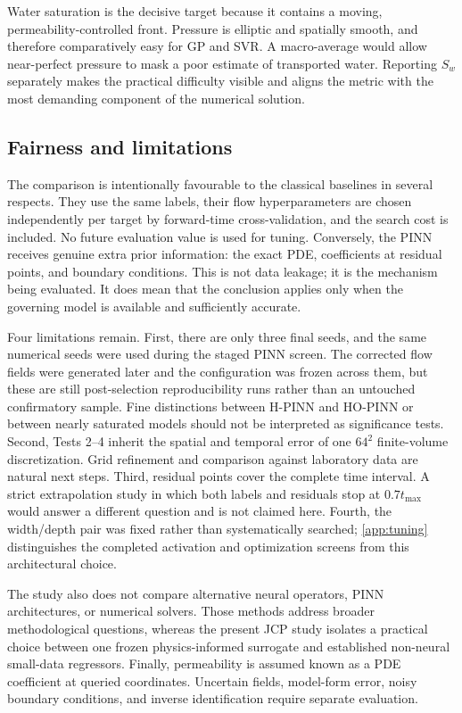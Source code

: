 Water saturation is the decisive target because it contains a moving, permeability-controlled front. Pressure is elliptic and spatially smooth, and therefore comparatively easy for GP and SVR. A macro-average would allow near-perfect pressure to mask a poor estimate of transported water. Reporting \(S_w\) separately makes the practical difficulty visible and aligns the metric with the most demanding component of the numerical solution.

\subsection{Fairness and limitations}

The comparison is intentionally favourable to the classical baselines in several respects. They use the same labels, their flow hyperparameters are chosen independently per target by forward-time cross-validation, and the search cost is included. No future evaluation value is used for tuning. Conversely, the PINN receives genuine extra prior information: the exact PDE, coefficients at residual points, and boundary conditions. This is not data leakage; it is the mechanism being evaluated. It does mean that the conclusion applies only when the governing model is available and sufficiently accurate.

Four limitations remain. First, there are only three final seeds, and the same numerical seeds were used during the staged PINN screen. The corrected flow fields were generated later and the configuration was frozen across them, but these are still post-selection reproducibility runs rather than an untouched confirmatory sample. Fine distinctions between H-PINN and HO-PINN or between nearly saturated models should not be interpreted as significance tests. Second, Tests 2--4 inherit the spatial and temporal error of one \(64^2\) finite-volume discretization. Grid refinement and comparison against laboratory data are natural next steps. Third, residual points cover the complete time interval. A strict extrapolation study in which both labels and residuals stop at \(0.7t_{\max}\) would answer a different question and is not claimed here. Fourth, the width/depth pair was fixed rather than systematically searched; \ref{app:tuning} distinguishes the completed activation and optimization screens from this architectural choice.

The study also does not compare alternative neural operators, PINN architectures, or numerical solvers. Those methods address broader methodological questions, whereas the present JCP study isolates a practical choice between one frozen physics-informed surrogate and established non-neural small-data regressors. Finally, permeability is assumed known as a PDE coefficient at queried coordinates. Uncertain fields, model-form error, noisy boundary conditions, and inverse identification require separate evaluation.
